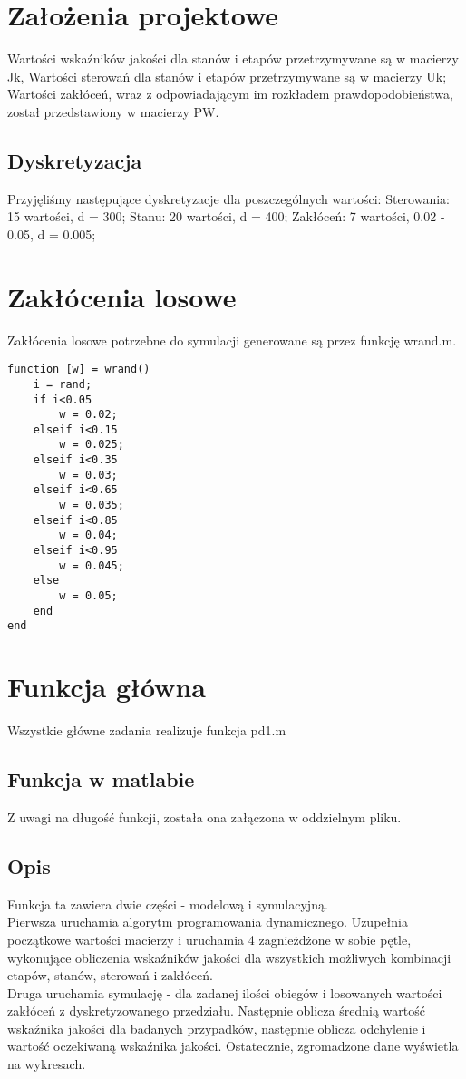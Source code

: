 \documentclass[11pt,a4paper]{article}
\begin{document}
\section{Założenia projektowe}
Wartości wskaźników jakości dla stanów i etapów przetrzymywane są w macierzy Jk,
Wartości sterowań dla stanów i etapów przetrzymywane są w macierzy Uk;
Wartości zakłóceń, wraz z odpowiadającym im rozkładem prawdopodobieństwa, został przedstawiony w macierzy PW.

\subsection{Dyskretyzacja}
Przyjęliśmy następujące dyskretyzacje dla poszczególnych wartości:
Sterowania: 15 wartości, d = 300;
Stanu: 20 wartości, d = 400;
Zakłóceń: 7 wartości, 0.02 - 0.05, d = 0.005;

\section{Zakłócenia losowe}
Zakłócenia losowe potrzebne do symulacji generowane są przez funkcję wrand.m.\\
\begin{verbatim}
function [w] = wrand()
    i = rand;
    if i<0.05
        w = 0.02;
    elseif i<0.15
        w = 0.025;
    elseif i<0.35
        w = 0.03;
    elseif i<0.65
        w = 0.035;
    elseif i<0.85
        w = 0.04;
    elseif i<0.95
        w = 0.045;
    else
        w = 0.05;
    end
end
\end{verbatim}

\section{Funkcja główna}
Wszystkie główne zadania realizuje funkcja pd1.m
\subsection{Funkcja w matlabie}
Z uwagi na długość funkcji, została ona załączona w oddzielnym pliku.

\subsection{Opis}
Funkcja ta zawiera dwie części - modelową i symulacyjną.\\
Pierwsza uruchamia algorytm programowania dynamicznego. Uzupełnia początkowe wartości macierzy i uruchamia 4 zagnieżdżone w sobie pętle, wykonujące obliczenia wskaźników jakości dla wszystkich możliwych kombinacji etapów, stanów, sterowań i zakłóceń.\\
Druga uruchamia symulację - dla zadanej ilości obiegów i losowanych wartości zakłóceń z dyskretyzowanego przedziału.
Następnie oblicza średnią wartość wskaźnika jakości dla badanych przypadków, następnie oblicza odchylenie i wartość oczekiwaną wskaźnika jakości.
Ostatecznie, zgromadzone dane wyświetla na wykresach.\\
\end{document}
